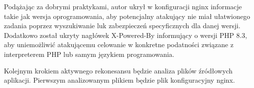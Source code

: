 \documentclass[12pt,twoside]{book}
\begin{document}
Podążając za dobrymi praktykami, autor ukrył w konfiguracji nginx informacje takie jak wersja oprogramowania, aby potencjalny atakujący nie miał ułatwionego zadania poprzez wyszukiwanie luk zabezpieczeń specyficznych dla danej wersji. Dodatkowo został ukryty nagłówek X-Powered-By informujący o wersji PHP 8.3, aby uniemożliwić atakującemu celowanie w konkretne podatności związane z interpreterem PHP lub samym językiem programowania.

Kolejnym krokiem aktywnego rekonesansu będzie analiza plików źródłowych aplikacji. Pierwszym analizowanym plikiem będzie plik konfiguracyjny nginx.




\listoffigures
\listoftables
\end{document}
